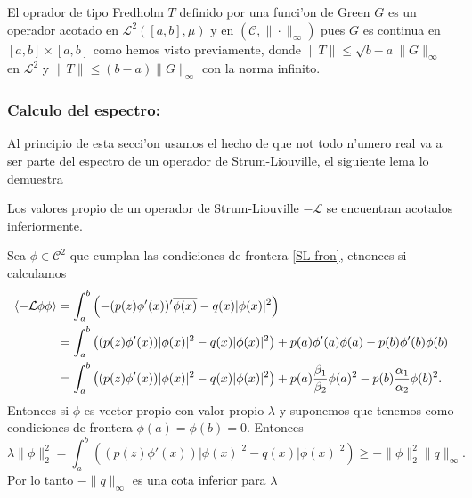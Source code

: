 \documentclass[main.tex]{subfiles}
\begin{document}
\obs El oprador de tipo Fredholm $T$ definido por una funci'on de Green $G$ es un operador acotado en $\mathcal{L}^{2}([a,b],\mu)$ y en $(\mathcal{C},\|\cdot\|_{\infty})$ pues $G$ es continua en $[a,b]\times[a,b]$ como hemos visto previamente, donde $\|T\|\leq\sqrt{b-a}\|G\|_{\infty}$ en $\mathcal{L}^{2}$ y $\|T\|\leq(b-a)\|G\|_{\infty}$ con la norma infinito.

\subsubsection*{Calculo del espectro:}
\noindent Al principio de esta secci'on usamos el hecho de que not todo n'umero real va a ser parte del espectro de un operador de Strum-Liouville, el siguiente lema lo demuestra
\begin{lema}
  Los valores propio de un operador de Strum-Liouville $-\mathcal{L}$ se encuentran acotados inferiormente.
  \end{lema}
  \dem Sea $\phi\in\mathcal{C}^{2}$ que cumplan las condiciones de frontera \ref{SL-fron}, etnonces si calculamos
  \begin{align*}  \braket{-\mathcal{L}\phi\phi}&=\int_{a}^{b}\left(-(p(z)\phi'(x))'\overline{\phi(x)}-q(x)|\phi(x)|^{2}\right)\\
                              &=\int_{a}^{b}\left((p(z)\phi'(x))|\phi(x)|^{2}-q(x)|\phi(x)|^{2}\right)
                                                +p(a)\phi'(a)\phi(a)-p(b)\phi'(b)\phi(b)\\
                              &=\int_{a}^{b}\left((p(z)\phi'(x))|\phi(x)|^{2}-q(x)|\phi(x)|^{2}\right)
                              +p(a)\frac{\beta_{1}}{\beta_{2}}\phi(a)^{2}-p(b)\frac{\alpha_{1}}{\alpha_{2}}\phi(b)^{2}.
  \end{align*}
  Entonces si $\phi$ es vector propio con valor propio $\lambda$ y suponemos que tenemos como condiciones de frontera $\phi(a)=\phi(b)=0.$ Entonces
  \[
    \lambda\|\phi\|_{2}^{2}=\int_{a}^{b}\left((p(z)\phi'(x))|\phi(x)|^{2}-q(x)|\phi(x)|^{2}\right)\geq-\|\phi\|^{2}_{2}\|q\|_{\infty}.
  \]
  Por lo tanto $-\|q\|_{\infty}$ es una cota inferior para $\lambda$
\end{document}
